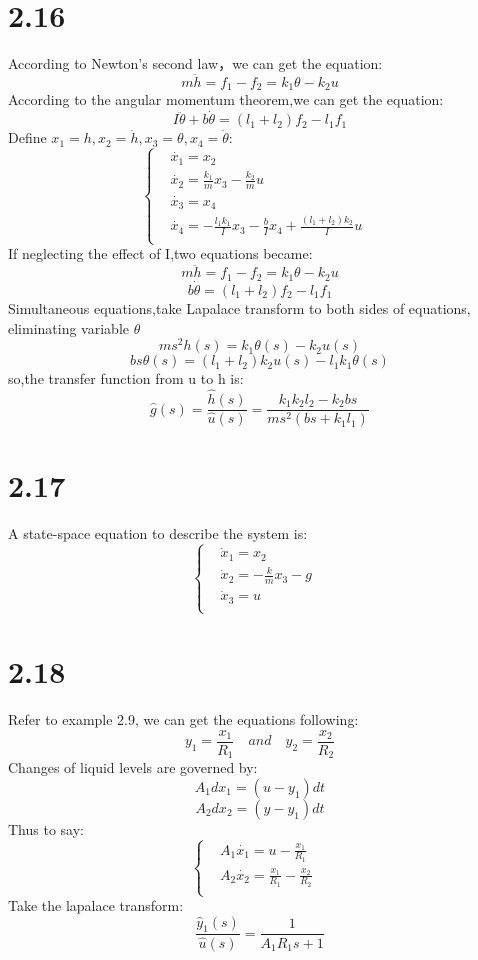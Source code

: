 \documentclass{article}
\begin{document}
\section*{2.16}
According to Newton's second law，we can get the equation:\\
\[m\ddot{h}=f_1-f_2=k_1\theta-k_2u\]
According to the angular momentum theorem,we can get the equation:
\[I\ddot{\theta}+b\dot{\theta}=(l_1+l_2)f_2-l_1f_1\]
Define $x_1=h,x_2=\dot{h},x_3=\theta,x_4=\dot{\theta}:$
\[\left\{
\begin{aligned}
&\dot{x_1}=x_2&\\ 
&\dot{x_2}=\frac{k_1}{m}x_3-\frac{k_2}{m}u&\\
&\dot{x_3}=x_4&\\  
&\dot{x_4}=-\frac{l_1k_1}{I}x_3-\frac{b}{I}x_4+\frac{(l_1+l_2)k_2}{I}u&\\
\end{aligned}
\right.
\]
If neglecting the effect of I,two equations became:\\
\[m\ddot{h}=f_1-f_2=k_1\theta-k_2u\]
\[b\dot{\theta}=(l_1+l_2)f_2-l_1f_1\]
Simultaneous equations,take Lapalace transform to both sides of equations, eliminating variable $\theta$\\
\[ms^2h(s)=k_1\theta(s)-k_2u(s)\]
\[bs\theta(s)=(l_1+l_2)k_2u(s)-l_1k_1\theta(s)\]
so,the transfer function from u to h is:
\[\hat{g}(s)=\frac{\hat{h}(s)}{\hat{u}(s)}=\frac{k_1k_2l_2-k_2bs}{ms^2(bs+k_1l_1)}\]

\section*{2.17}
A state-space equation to describe the system is:\\
\[\left\{
\begin{aligned}
&\dot{x}_1=x_2&\\
&\dot{x}_2=-\frac{k}{m}x_3-g&\\
&\dot{x}_3=u&\\
\end{aligned}
\right.
\]

\section*{2.18}
Refer to example 2.9, we can get the equations following:\\
\[y_1=\frac{x_1}{R_1}\quad and \quad y_2=\frac{x_2}{R_2} \]
Changes of liquid levels are governed by:
\[A_1dx_1=(u-y_1)dt\]
\[A_2dx_2=(y-y_1)dt\]
Thus to say:
\[\left\{
\begin{aligned}
&A_1\dot{x_1}=u-\frac{x_1}{R_1}&\\
&A_2\dot{x_2}=\frac{x_1}{R_1}-\frac{x_2}{R_2}&\\
\end{aligned} 
\right.
\]
Take the lapalace transform:
\[\frac{\hat{y}_1(s)}{\hat{u}(s)}=\frac{1}{A_1R_1s+1}\]
\end{document}
